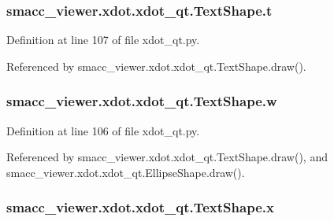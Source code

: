 \subsubsection[{\texorpdfstring{t}{t}}]{\setlength{\rightskip}{0pt plus 5cm}smacc\+\_\+viewer.\+xdot.\+xdot\+\_\+qt.\+Text\+Shape.\+t}\hypertarget{classsmacc__viewer_1_1xdot_1_1xdot__qt_1_1TextShape_a355e76c951da6ca7af4a69b6eaeea2e8}{}\label{classsmacc__viewer_1_1xdot_1_1xdot__qt_1_1TextShape_a355e76c951da6ca7af4a69b6eaeea2e8}


Definition at line 107 of file xdot\+\_\+qt.\+py.



Referenced by smacc\+\_\+viewer.\+xdot.\+xdot\+\_\+qt.\+Text\+Shape.\+draw().

\subsubsection[{\texorpdfstring{w}{w}}]{\setlength{\rightskip}{0pt plus 5cm}smacc\+\_\+viewer.\+xdot.\+xdot\+\_\+qt.\+Text\+Shape.\+w}\hypertarget{classsmacc__viewer_1_1xdot_1_1xdot__qt_1_1TextShape_a7af76f9d10ceafd1209cf7bfce73c7be}{}\label{classsmacc__viewer_1_1xdot_1_1xdot__qt_1_1TextShape_a7af76f9d10ceafd1209cf7bfce73c7be}


Definition at line 106 of file xdot\+\_\+qt.\+py.



Referenced by smacc\+\_\+viewer.\+xdot.\+xdot\+\_\+qt.\+Text\+Shape.\+draw(), and smacc\+\_\+viewer.\+xdot.\+xdot\+\_\+qt.\+Ellipse\+Shape.\+draw().

\subsubsection[{\texorpdfstring{x}{x}}]{\setlength{\rightskip}{0pt plus 5cm}smacc\+\_\+viewer.\+xdot.\+xdot\+\_\+qt.\+Text\+Shape.\+x}\hypertarget{classsmacc__viewer_1_1xdot_1_1xdot__qt_1_1TextShape_a5ef1c12aaeabfc80fbe893b6a5f9c3d3}{}\label{classsmacc__viewer_1_1xdot_1_1xdot__qt_1_1TextShape_a5ef1c12aaeabfc80fbe893b6a5f9c3d3}


